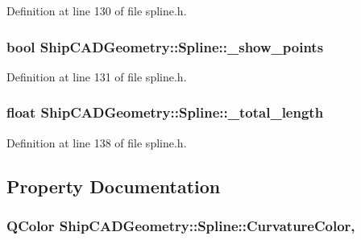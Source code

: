 Definition at line 130 of file spline.\-h.

\hypertarget{classShipCADGeometry_1_1Spline_a64b335f1c21a26f5f01ddcfbf92501d6}{
\subsubsection[{\-\_\-show\-\_\-points}]{\setlength{\rightskip}{0pt plus 5cm}bool Ship\-C\-A\-D\-Geometry\-::\-Spline\-::\-\_\-show\-\_\-points\hspace{0.3cm}{\ttfamily [protected]}}}\label{classShipCADGeometry_1_1Spline_a64b335f1c21a26f5f01ddcfbf92501d6}


Definition at line 131 of file spline.\-h.

\hypertarget{classShipCADGeometry_1_1Spline_a4f4832362958e63f9b9503414466a2ae}{
\subsubsection[{\-\_\-total\-\_\-length}]{\setlength{\rightskip}{0pt plus 5cm}float Ship\-C\-A\-D\-Geometry\-::\-Spline\-::\-\_\-total\-\_\-length\hspace{0.3cm}{\ttfamily [protected]}}}\label{classShipCADGeometry_1_1Spline_a4f4832362958e63f9b9503414466a2ae}


Definition at line 138 of file spline.\-h.



\subsection{Property Documentation}
\hypertarget{classShipCADGeometry_1_1Spline_a4bc6d35c4d11b8df95e69300ef7120c7}{
\subsubsection[{Curvature\-Color}]{\setlength{\rightskip}{0pt plus 5cm}Q\-Color Ship\-C\-A\-D\-Geometry\-::\-Spline\-::\-Curvature\-Color\hspace{0.3cm}{\ttfamily [read]}, {\ttfamily [write]}}}\label{classShipCADGeometry_1_1Spline_a4bc6d35c4d11b8df95e69300ef7120c7}


